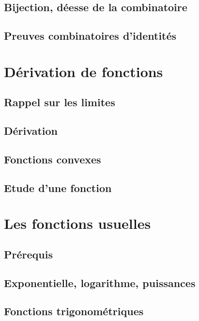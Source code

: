 \documentclass[11pt,twoside,a4paper]{article}
\begin{document}
\subsection{Bijection, déesse de la combinatoire}

\subsection{Preuves combinatoires d'identités}


\newpage
\section{Dérivation de fonctions}

\subsection{Rappel sur les limites}

\subsection{Dérivation}

\subsection{Fonctions convexes}

\subsection{Etude d'une fonction}

\newpage
\section{Les fonctions usuelles}

\subsection{Prérequis}

\subsection{Exponentielle, logarithme, puissances}

\subsection{Fonctions trigonométriques}
\end{document}
